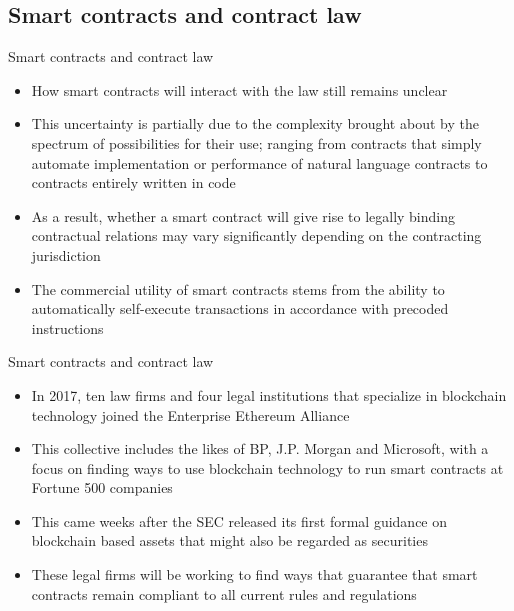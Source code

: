 \documentclass[10pt]{beamer}
\begin{document}

\subsection{Smart contracts and contract law}

\begin{frame}{Smart contracts and contract law}
	\begin{itemize}
		\item How smart contracts will interact with the law still remains unclear
		\item This uncertainty is partially due to the complexity brought about by the spectrum of possibilities for their use; ranging from contracts that simply automate implementation or performance of natural language contracts to contracts entirely written in code
		\item As a result, whether a smart contract will give rise to legally binding contractual relations may vary significantly depending on the contracting jurisdiction
		\item The commercial utility of smart contracts stems from the ability to automatically self-execute transactions in accordance with precoded instructions
	\end{itemize}
\end{frame}



\begin{frame}{Smart contracts and contract law}
	\begin{itemize}
		\item In 2017, ten law firms and four legal institutions that specialize in blockchain technology joined the Enterprise Ethereum Alliance
		\item This collective includes the likes of BP, J.P. Morgan and Microsoft, with a focus on finding ways to use blockchain technology to run smart contracts at Fortune 500 companies
		\item This came weeks after the SEC released its first formal guidance on blockchain based assets that might also be regarded as securities
		\item These legal firms will be working to find ways that guarantee that smart contracts remain compliant to all current rules and regulations
	\end{itemize}
\end{frame}
\end{document}
